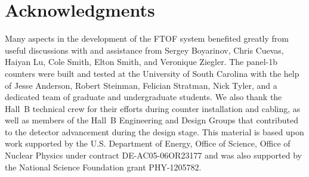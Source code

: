 \documentclass[3p,times,twocolumn]{elsarticle}
\begin{document}
\section*{Acknowledgments}

Many aspects in the development of the FTOF system benefited greatly from useful discussions with and
assistance from Sergey Boyarinov, Chris Cuevas, Haiyan Lu, Cole Smith, Elton Smith, and Veronique Ziegler. The
panel-1b counters were built and tested at the University of South Carolina with the help of Jesse Anderson,
Robert Steinman, Felician Stratman, Nick Tyler, and a dedicated team of graduate and undergraduate students.
We also thank the Hall~B technical crew for their efforts during counter installation and cabling, as well as
members of the Hall~B Engineering and Design Groups that contributed to the detector advancement during the
design stage. This material is based upon work supported by the U.S. Department of Energy, Office of Science,
Office of Nuclear Physics under contract DE-AC05-06OR23177 and was also supported by the National Science
Foundation grant PHY-1205782.
\end{document}
